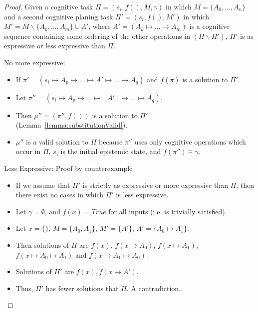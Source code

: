 \begin{proof} \label{proof:aggregateExpressiveness}
Given a cognitive task $\Pi=(s_i,f(), M, \gamma)$ in which $M=\{A_0,...,A_n\}$ and a second cognitive planing task $\Pi'=(s_i,f(),M')$ in which $M'= M \smallsetminus \{A_k,...,A_m\} \cup A'$, where $A'=(A_k \longmapsto... \longmapsto A_m)$ is a cognitive sequence containing some ordering of the other operations in $(\Pi \smallsetminus \Pi')$, $\Pi'$ is as expressive or less expressive than $\Pi$.

\item No more expressive:
\begin{itemize}
\item If $\pi' = (s_i\longmapsto A_p \longmapsto ... \longmapsto A' \longmapsto ... \longmapsto A_q)$ and $f(\pi)$ is a solution to $\Pi'$.
\item Let $\pi'' = (s_i\longmapsto A_p \longmapsto ... \longmapsto [A'] \longmapsto ... \longmapsto A_q)$.
\item Then $\mu''=(\pi'',f())$ is a solution to $\Pi'$ (Lemma~\ref{lemma:substitutionValid}).
\item $\mu''$ is a valid solution to $\Pi$ because $\pi''$ uses only cognitive operations which occur in $\Pi$, $s_i$ is the initial epistemic state, and $f(\pi'') \models \gamma$. 
\end{itemize}
\item Less Expressive: Proof by counterexample
\begin{itemize}
\item If we assume that $\Pi'$ is strictly as expressive or more expressive than $\Pi$, then there exist no cases in which $\Pi'$ is less expressive.
\item Let $\gamma = \emptyset$, and $f(x)=True$ for all inputs (i.e. is trivially satisfied).
\item Let $x=\{\}$, $M=\{A_0,A_1\}$, $M'=\{A'\}$, $A'=\{A_0\longmapsto A_1\}$.
\item Then solutions of $\Pi$ are $f(x)$, $f(x \longmapsto A_0)$, $f(x \longmapsto A_1)$, $f(x \longmapsto A_0\longmapsto A_1)$ and $f(x \longmapsto A_1\longmapsto A_0)$.
\item Solutions of $\Pi'$ are $f(x), f(x \longmapsto A')$.
\item Thus, $\Pi'$ has fewer solutions that $\Pi$. A contradiction.
\end{itemize}
\end{proof}

